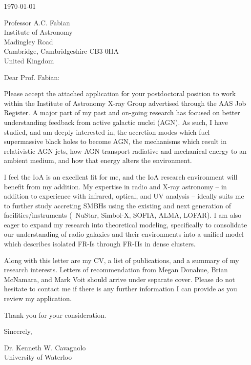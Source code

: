 \documentclass[11pt]{article}
\begin{document}
\today

Professor A.C. Fabian\\
Institute of Astronomy\\
Madingley Road\\
Cambridge, Cambridgeshire CB3 0HA\\
United Kingdom

Dear Prof. Fabian:

Please accept the attached application for your postdoctoral position
to work within the Institute of Astronomy X-ray Group advertised
through the AAS Job Register. A major part of my past and on-going
research has focused on better understanding feedback from active
galactic nuclei (AGN). As such, I have studied, and am deeply
interested in, the accretion modes which fuel supermassive black holes
to become AGN, the mechanisms which result in relativistic AGN jets,
how AGN transport radiative and mechanical energy to an ambient
medium, and how that energy alters the environment.

I feel the IoA is an excellent fit for me, and the IoA research
environment will benefit from my addition. My expertise in radio and
X-ray astronomy -- in addition to experience with infrared, optical,
and UV analysis -- ideally suits me to further study accreting SMBHs
using the existing and next generation of facilities/instruments (\ie\
NuStar, Simbol-X, SOFIA, ALMA, LOFAR). I am also eager to expand my
research into theoretical modeling, specifically to consolidate our
understanding of radio galaxies and their environments into a unified
model which describes isolated FR-Is through FR-IIs in dense clusters.

Along with this letter are my CV, a list of publications, and a
summary of my research interests. Letters of recommendation from Megan
Donahue, Brian McNamara, and Mark Voit should arrive under separate
cover. Please do not hesitate to contact me if there is any further
information I can provide as you review my application.

Thank you for your consideration.

Sincerely,\\
\begin{minipage}{7.5in}
\end{minipage}
Dr. Kenneth W. Cavagnolo\\
University of Waterloo
\end{document}
